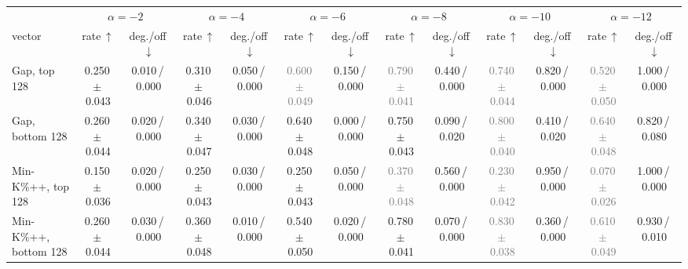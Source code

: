 \begin{tabular}{@{}lcccccccccccc@{}}
\toprule
& \multicolumn{2}{c}{$\alpha=-2$} & \multicolumn{2}{c}{$\alpha=-4$} & \multicolumn{2}{c}{$\alpha=-6$} & \multicolumn{2}{c}{$\alpha=-8$} & \multicolumn{2}{c}{$\alpha=-10$} & \multicolumn{2}{c}{$\alpha=-12$} \\
\cmidrule(lr){2-3}\cmidrule(lr){4-5}\cmidrule(lr){6-7}\cmidrule(lr){8-9}\cmidrule(lr){10-11}\cmidrule(lr){12-13}
vector & rate\,$\uparrow$ & deg./off\,$\downarrow$ & rate\,$\uparrow$ & deg./off\,$\downarrow$ & rate\,$\uparrow$ & deg./off\,$\downarrow$ & rate\,$\uparrow$ & deg./off\,$\downarrow$ & rate\,$\uparrow$ & deg./off\,$\downarrow$ & rate\,$\uparrow$ & deg./off\,$\downarrow$ \\
\midrule
Gap, top 128 & 0.250\,{\scriptsize$\pm$\,0.043} & {\scriptsize 0.010\,/\,0.000} & 0.310\,{\scriptsize$\pm$\,0.046} & {\scriptsize 0.050\,/\,0.000} & \textcolor{gray}{0.600\,{\scriptsize$\pm$\,0.049}} & {\scriptsize 0.150\,/\,0.000} & \textcolor{gray}{0.790\,{\scriptsize$\pm$\,0.041}} & {\scriptsize 0.440\,/\,0.000} & \textcolor{gray}{0.740\,{\scriptsize$\pm$\,0.044}} & {\scriptsize 0.820\,/\,0.000} & \textcolor{gray}{0.520\,{\scriptsize$\pm$\,0.050}} & {\scriptsize 1.000\,/\,0.000} \\
Gap, bottom 128 & 0.260\,{\scriptsize$\pm$\,0.044} & {\scriptsize 0.020\,/\,0.000} & 0.340\,{\scriptsize$\pm$\,0.047} & {\scriptsize 0.030\,/\,0.000} & 0.640\,{\scriptsize$\pm$\,0.048} & {\scriptsize 0.000\,/\,0.000} & 0.750\,{\scriptsize$\pm$\,0.043} & {\scriptsize 0.090\,/\,0.020} & \textcolor{gray}{0.800\,{\scriptsize$\pm$\,0.040}} & {\scriptsize 0.410\,/\,0.020} & \textcolor{gray}{0.640\,{\scriptsize$\pm$\,0.048}} & {\scriptsize 0.820\,/\,0.080} \\
Min-K\%++, top 128 & 0.150\,{\scriptsize$\pm$\,0.036} & {\scriptsize 0.020\,/\,0.000} & 0.250\,{\scriptsize$\pm$\,0.043} & {\scriptsize 0.030\,/\,0.000} & 0.250\,{\scriptsize$\pm$\,0.043} & {\scriptsize 0.050\,/\,0.000} & \textcolor{gray}{0.370\,{\scriptsize$\pm$\,0.048}} & {\scriptsize 0.560\,/\,0.000} & \textcolor{gray}{0.230\,{\scriptsize$\pm$\,0.042}} & {\scriptsize 0.950\,/\,0.000} & \textcolor{gray}{0.070\,{\scriptsize$\pm$\,0.026}} & {\scriptsize 1.000\,/\,0.000} \\
Min-K\%++, bottom 128 & 0.260\,{\scriptsize$\pm$\,0.044} & {\scriptsize 0.030\,/\,0.000} & 0.360\,{\scriptsize$\pm$\,0.048} & {\scriptsize 0.010\,/\,0.000} & 0.540\,{\scriptsize$\pm$\,0.050} & {\scriptsize 0.020\,/\,0.000} & 0.780\,{\scriptsize$\pm$\,0.041} & {\scriptsize 0.070\,/\,0.000} & \textcolor{gray}{0.830\,{\scriptsize$\pm$\,0.038}} & {\scriptsize 0.360\,/\,0.000} & \textcolor{gray}{0.610\,{\scriptsize$\pm$\,0.049}} & {\scriptsize 0.930\,/\,0.010} \\

\end{tabular}
